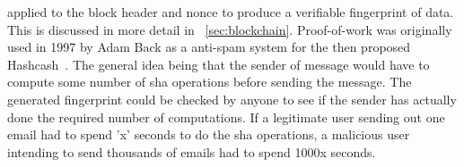 applied to the block header and nonce to produce a verifiable fingerprint of
data. This is discussed in more detail in ~\ref{sec:blockchain}. Proof-of-work
was originally used in 1997 by Adam Back as a anti-spam system for the then
proposed Hashcash~\cite{back2002hashcash}. The general idea being that the
sender of message would have to compute some number of sha operations before
sending the message.  The generated fingerprint could be checked by anyone to
see if the sender has actually done the required number of computations. If a
legitimate user sending out one email had to spend 'x' seconds to do the sha
operations, a malicious user intending to send thousands of emails had to spend
1000x seconds. 


%

